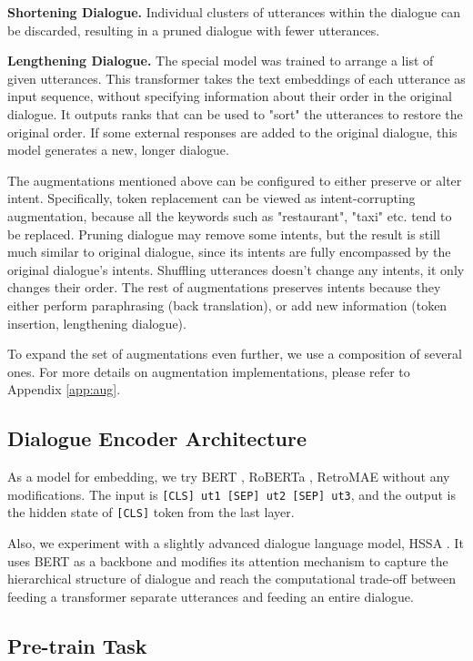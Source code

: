 \documentclass{article}
\begin{document}
\textbf{Shortening Dialogue.} Individual clusters of utterances within the dialogue can be discarded, resulting in a pruned dialogue with fewer utterances.

\textbf{Lengthening Dialogue.} The special model was trained to arrange a list of given utterances. This transformer takes the text embeddings of each utterance as input sequence, without specifying information about their order in the original dialogue. It outputs ranks that can be used to "sort" the utterances to restore the original order. If some external responses are added to the original dialogue, this model generates a new, longer dialogue.

The augmentations mentioned above can be configured to either preserve or alter intent. Specifically, token replacement can be viewed as intent-corrupting augmentation, because all the keywords such as "restaurant", "taxi" etc. tend to be replaced. Pruning dialogue may remove some intents, but the result is still much similar to original dialogue, since its intents are fully encompassed by the original dialogue's intents. 
Shuffling utterances doesn't change any intents, it only changes their order. The rest of augmentations preserves intents because they either perform paraphrasing (back translation), or add new information (token insertion, lengthening dialogue).

To expand the set of augmentations even further, we use a composition of several ones. For more details on augmentation implementations, please refer to Appendix \ref{app:aug}.

\subsection{Dialogue Encoder Architecture}

As a model for embedding, we try BERT \cite{devlin2019bert}, RoBERTa \cite{liu2019roberta}, RetroMAE \cite{xiao2022retromae} without any modifications. The input is \texttt{[CLS] ut1 [SEP] ut2 [SEP] ut3}, and the output is the hidden state of \texttt{[CLS]} token from the last layer. 

Also, we experiment with a slightly advanced dialogue language model, HSSA \cite{zhang-etal-2023-dialog}. It uses BERT as a backbone and modifies its attention mechanism to capture the hierarchical structure of dialogue and reach the computational trade-off between feeding a transformer separate utterances and feeding an entire dialogue.

\subsection{Pre-train Task} \label{sec:pretrain}
\end{document}
